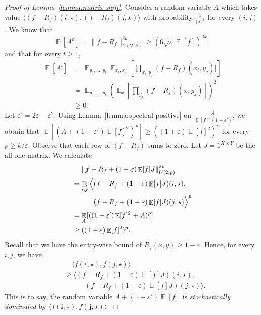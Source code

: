\documentclass[11pt]{article}
\DeclareMathOperator*{\E}{\mathbb{E}}
\newcommand{\1}{ \mathbbm{1}}
\newcommand{\eps}{\varepsilon}
\begin{document}
\begin{proof}[Proof of Lemma~\ref{lemma:matrix-shift}]
    Consider a random variable $A$ which takes value $\langle (f-R_f)(i,\star), (f-R_f)(j,\star)\rangle$ with probability $\frac{1}{|X|^2}$ for every $(i,j)$. We know that
    $$
    \E[A^k] = \|f-R_f\|_{U(2,k)}^{2k} \ge (6\sqrt{\eps} \E[f])^{2k},
    $$
    and that for every $t\ge 1$,
    $$
    \begin{aligned}
    \E[A^t] 
    &= \E_{y_1,\dots, y_t} \E_{x_1,x_2} \left[\prod_{x_i,y_j}(f-R_f)(x_i,y_j)]\right] \\
    &= \E_{y_1,\dots, y_t}  \left( \E_x \left[\prod_{y_j}(f-R_f)(x,y_j) \right] \right)^2 \\
    &\ge 0.
    \end{aligned}
    $$
    Let $\eps' = 2\eps - \eps^2$. Using Lemma~\ref{lemma:spectral-positive} on $\frac{A}{\E[f]^2(1-\eps')}$, we obtain that $\E[(A + (1-\eps')\E[f]^2)^p] \ge ((1+\eps)\E[f]^2)^p$ for every $p\ge k/\eps$. Observe that each row of $(f-R_f)$ sums to zero. Let $J = 1^{X\times Y}$ be the all-one matrix. We calculate
    \begin{align}
    &~~~~ \|f-R_f + (1-\eps)\E[f] J\|_{U(2,p)}^{2p} \notag \\
    &= \E_{i,j} \Big{\langle} (f-R_f + (1-\eps)\E[f] J)(i,\star),  \\
    &~~~~~~~~~  (f-R_f + (1-\eps)\E[f] J)(j,\star) \Big{\rangle}^p \notag \\
    &= \E_A[((1-\eps')\E[f]^2+A)^p] \notag \\
    & \ge ((1+\eps)\E[f]^2)^{p}. \notag
    \end{align}
    Recall that we have the entry-wise bound of $R_f(x,y) \ge 1-\eps$. Hence, for every $i,j$, we have
    \begin{align*}
    &~~~~~\langle f(i,\star), f(j,\star) \rangle \\
    &\ge \Big\langle (f-R_f + (1-\eps)\E[f] J)(i,\star), \\
    &~~~~~~~~~~~~~(f-R_f + (1-\eps)\E[f] J)(j,\star) \Big\rangle.
    \end{align*}
    This is to say, the random variable $A+(1-\eps')\E[f]$ is \emph{stochastically dominated} by $\langle f(\mathbf{i},\star),f(\mathbf{j}, \star)\rangle$.


\end{proof}
\end{document}
